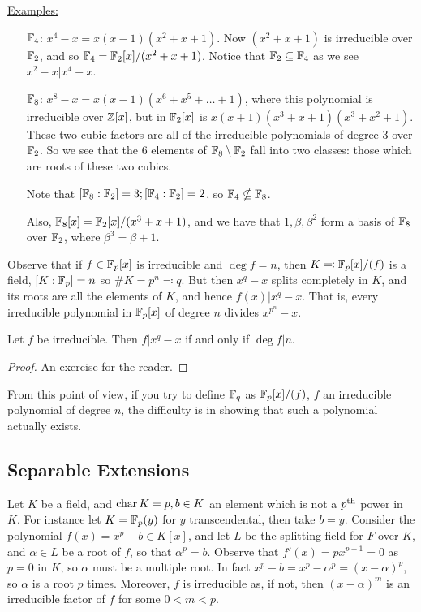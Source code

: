 \documentclass[10pt,a4paper]{article}
\begin{document}
\underline{Examples:} 
\begin{itemize}
\item[$\mathbb{F}_4$:] $x^4-x = x(x-1)(x^2+x+1)$. Now $(x^2+x+1)$ is irreducible over $\mathbb{F}_2$, and so $\mathbb{F}_4 = \mathbb{F}_2[x] / (x^2+x+1)$. Notice that $\mathbb{F}_2 \subseteq \mathbb{F}_4$ as we see $x^2-x | x^4 - x$.
\item[$\mathbb{F}_8$:] $x^8-x = x(x-1)(x^6+x^5+\ldots + 1)$, where this polynomial is irreducible over $\mathbb{Z}[x]$, but in $\mathbb{F}_2[x]$ is $x(x+1)(x^3+x+1)(x^3+x^2+1)$. These two cubic factors are all of the irreducible polynomials of degree 3 over $\mathbb{F}_2$. So we see that the $6$ elements of $\mathbb{F}_8\setminus \mathbb{F}_2$ fall into two classes: those which are roots of these two cubics.

Note that $[\mathbb{F}_8:\mathbb{F}_2] = 3; [\mathbb{F}_4:\mathbb{F}_2] = 2$, so $\mathbb{F}_4 \nsubseteq \mathbb{F}_8$.

Also, $\mathbb{F}_8[x] = \mathbb{F}_2[x]/(x^3+ x+1)$, and we have that $1,\beta, \beta^2$ form a basis of $\mathbb{F}_8$ over $\mathbb{F}_2$, where $\beta^3 = \beta+1$.
\end{itemize}
Observe that if $f\in \mathbb{F}_p[x]$ is irreducible and $\deg f = n$, then $K \eqqcolon \mathbb{F}_p[x]/(f)$ is a field, $[K:\mathbb{F}_p] = n$ so $\#K = p^n \eqqcolon q$. But then $x^q - x$ splits completely in $K$, and its roots are all the elements of $K$, and hence $f(x)|x^q - x$. That is, every irreducible polynomial in $\mathbb{F}_p[x]$ of degree $n$ divides $x^{p^n} - x$.
\begin{proposition}
Let $f$ be irreducible. Then $f|x^q - x$ if and only if $\deg f | n$.
\end{proposition}
\begin{proof}
An exercise for the reader.
\end{proof}
From this point of view, if you try to define $\mathbb{F}_q$ as $\mathbb{F}_p[x]/(f)$, $f$ an irreducible polynomial of degree $n$, the difficulty is in showing that such a polynomial actually exists.

\subsection*{Separable Extensions}
Let $K$ be a field, and $\operatorname{char} K = p, b\in K$ an element which is not a $p\textsuperscript{th}$ power in $K$. For instance let $K = \mathbb{F}_p(y)$ for $y$ transcendental, then take $b = y$. Consider the polynomial $f(x) = x^p-b \in K[x]$, and let $L$ be the splitting field for $F$ over $K$, and $\alpha \in L$ be a root of $f$, so that $\alpha^p = b$. Observe that $f'(x) = px^{p-1} = 0$ as $p=0$ in $K$, so $\alpha$ must be a multiple root. In fact $x^p-b = x^p - \alpha^p = (x-\alpha)^p$, so $\alpha$ is a root $p$ times. Moreover, $f$ is irreducible as, if not, then $(x-\alpha)^m$ is an irreducible factor of $f$ for some $0 < m < p$.
\end{document}

